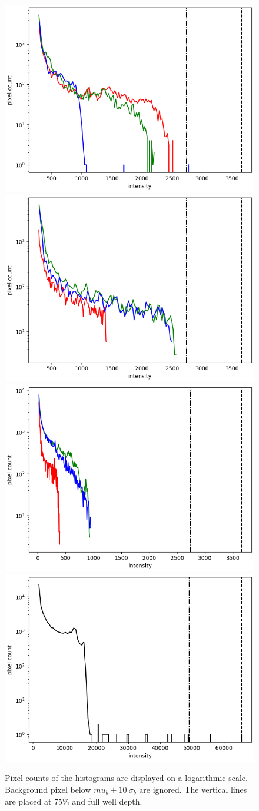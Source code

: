 \documentclass[10pt,a4paper,notitlepage]{article}
\begin{document}
	\begin{figure}[h]
		\includegraphics[width=0.49\columnwidth]{img/alpori_hist.png}
		\includegraphics[width=0.49\columnwidth]{img/betori_hist.png} \\
		\includegraphics[width=0.49\columnwidth]{img/alpcma_hist.png}
		\includegraphics[width=0.49\columnwidth]{img/alpleo_hist.png}
		
		\caption[histograms]%
		{Pixel counts of the histograms are displayed on a logarithmic scale. Background pixel below $mu_b + 10\ \sigma_b$ are ignored. The vertical lines are placed at $75\%$ and full well depth.}
		\label{fig:histograms}
	\end{figure}
	
\end{document}

